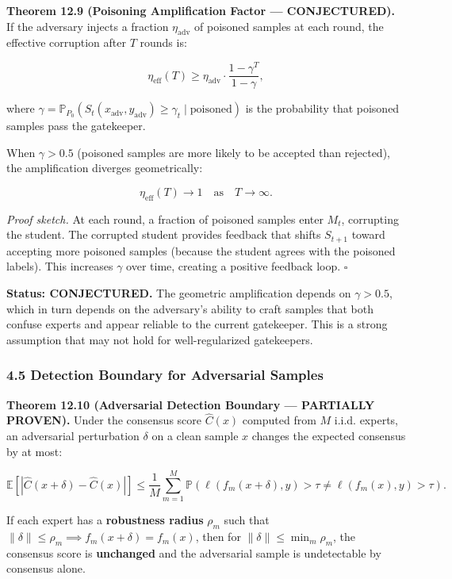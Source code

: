 \documentclass[
  12pt,
]{article}
\begin{document}
\textbf{Theorem 12.9 (Poisoning Amplification Factor --- CONJECTURED).}
If the adversary injects a fraction \(\eta_{\text{adv}}\) of poisoned
samples at each round, the effective corruption after \(T\) rounds is:

\[\eta_{\text{eff}}(T) \geq \eta_{\text{adv}} \cdot \frac{1 - \gamma^T}{1 - \gamma},\]

where
\(\gamma = \mathbb{P}_{P_0}(S_t(x_{\text{adv}}, y_{\text{adv}}) \geq \gamma_t \mid \text{poisoned})\)
is the probability that poisoned samples pass the gatekeeper.

When \(\gamma > 0.5\) (poisoned samples are more likely to be accepted
than rejected), the amplification diverges geometrically:

\[\eta_{\text{eff}}(T) \to 1 \quad \text{as} \quad T \to \infty.\]

\emph{Proof sketch.} At each round, a fraction of poisoned samples enter
\(M_t\), corrupting the student. The corrupted student provides feedback
that shifts \(S_{t+1}\) toward accepting more poisoned samples (because
the student agrees with the poisoned labels). This increases \(\gamma\)
over time, creating a positive feedback loop. \(\square\)

\textbf{Status: CONJECTURED.} The geometric amplification depends on
\(\gamma > 0.5\), which in turn depends on the adversary's ability to
craft samples that both confuse experts and appear reliable to the
current gatekeeper. This is a strong assumption that may not hold for
well-regularized gatekeepers.

\subsubsection{4.5 Detection Boundary for Adversarial
Samples}\label{detection-boundary-for-adversarial-samples}

\textbf{Theorem 12.10 (Adversarial Detection Boundary --- PARTIALLY
PROVEN).} Under the consensus score \(\hat{C}(x)\) computed from \(M\)
i.i.d. experts, an adversarial perturbation \(\delta\) on a clean sample
\(x\) changes the expected consensus by at most:

\[\mathbb{E}[|\hat{C}(x + \delta) - \hat{C}(x)|] \leq \frac{1}{M} \sum_{m=1}^M \mathbb{P}(\ell(f_m(x+\delta), y) > \tau \neq \ell(f_m(x), y) > \tau).\]

If each expert has a \textbf{robustness radius} \(\rho_m\) such that
\(\|\delta\| \leq \rho_m \implies f_m(x+\delta) = f_m(x)\), then for
\(\|\delta\| \leq \min_m \rho_m\), the consensus score is
\textbf{unchanged} and the adversarial sample is undetectable by
consensus alone.
\end{document}
